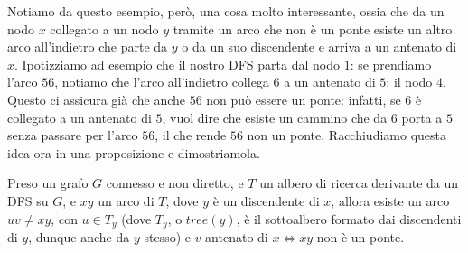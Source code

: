 \documentclass[11pt, a4paper, titlepage, oneside]{scrbook}
\begin{document}
Notiamo da questo esempio, però, una cosa molto interessante, ossia che da un nodo $x$ collegato a un nodo $y$ tramite un arco che non è un ponte esiste un altro arco all'indietro che parte da $y$ o da un suo discendente e arriva a un antenato di $x$. Ipotizziamo ad esempio che il nostro DFS parta dal nodo $1$: se prendiamo l'arco $56$, notiamo che l'arco all'indietro collega $6$ a un antenato di $5$: il nodo $4$. Questo ci assicura già che anche $56$ non può essere un ponte: infatti, se $6$ è collegato a un antenato di $5$, vuol dire che esiste un cammino che da $6$ porta a $5$ senza passare per l'arco $56$, il che rende $56$ non un ponte. Racchiudiamo questa idea ora in una proposizione e dimostriamola.

\begin{Proposizione}[]
\label{propos-arco-indietro-collega-antenato}
Preso un grafo $G$ connesso e non diretto, e $T$ un albero di ricerca derivante da un DFS su $G$, e $xy$ un arco di $T$, dove $y$ è un discendente di $x$, allora esiste un arco $uv \neq xy$, con $u \in T_y$ (dove $T_y$, o $tree(y)$, è il sottoalbero formato dai discendenti di $y$, dunque anche da $y$ stesso) e $v$ antenato di $x \iff xy$ non è un ponte.  
\end{Proposizione}

\Dimostrazione \nopagebreak
\end{document}

